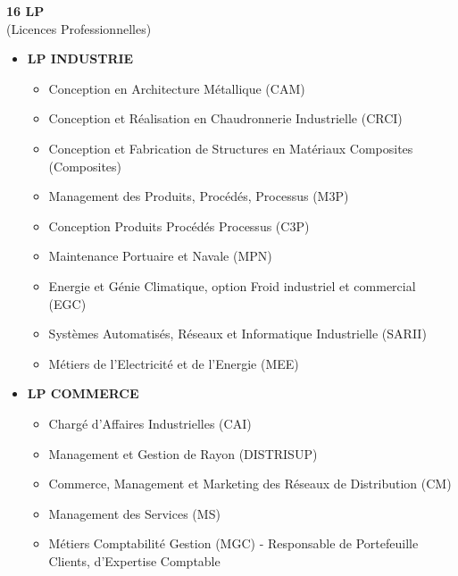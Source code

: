 \documentclass[11pt]{article}
\begin{document}
\newpage
\begin{center}
\textbf{16 LP}\\
(Licences Professionnelles)
\vspace*{1cm}
\end{center}
\begin{itemize}
\itemsep 0.5cm
\item \textbf{LP INDUSTRIE}
\begin{itemize}
\item Conception en Architecture Métallique (CAM)
\item Conception et Réalisation en Chaudronnerie Industrielle (CRCI)
\item Conception et Fabrication de Structures en Matériaux Composites (Composites)
\item Management des Produits, Procédés, Processus (M3P)
\item Conception Produits Procédés Processus (C3P)
\item Maintenance Portuaire et Navale (MPN)
\item Energie et Génie Climatique, option Froid industriel et commercial (EGC)
\item Systèmes Automatisés, Réseaux et Informatique Industrielle (SARII)
\item Métiers de l'Electricité et de l'Energie (MEE)
\end{itemize}

\item \textbf{LP COMMERCE}
\begin{itemize}
\item Chargé d'Affaires Industrielles (CAI)
\item Management et Gestion de Rayon (DISTRISUP)
\item Commerce, Management et Marketing des Réseaux de Distribution (CM)
\item Management des Services (MS)
\item Métiers Comptabilité Gestion (MGC) - Responsable de Portefeuille Clients, d'Expertise Comptable
\end{itemize}


\end{itemize}
\end{document}
